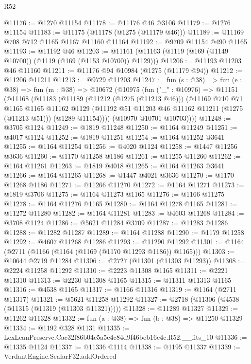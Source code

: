 \begin{lexlean}{R52}
\begin{coremodule}
@11176 := @1270 @11154
@11178 := @11176 @46 @3106
@11179 := @1276 @11154
@11183 := @11175 (@11178 (@1275 (@11179 @46)))
@11189 := @11169 @708 @712 @1165 @1167 @11160 @11164
@11192 := @9709 @11154 @490 @1165
@11193 := @11192 @46
@11203 := @11161 (@11163 (@1119 (@169 (@1149 @10700)) (@1119 (@169 (@1153 @10700)) @1129)))
@11206 := @11193 @11203 @46 @11160
@11211 := @11176 @94 @10984 (@1275 (@11179 @94))
@11212 := @11206 @11211
@11213 := @9729 @11203
@11247 := fun (s : @38) =>
  fun (e : @38) =>
  fun (m : @38) =>
  @10672
    (@10975
      (fun ("_" : @10976) =>
      @11151
        (@11168
          (@11183
            (@11189
              (@11212 (@1275 (@11213 @46)))
              (@11169
                @710
                @71
                @1165
                @1165
                @11162
                @1129
                (@11192 @51 @11203 @46 @11162 @11211 (@1275 (@11213 @51)))
                (@1289 @11154))))
          (@10970 @10701 @10703))))
@11248 := @3705 @1124
@11249 := @1819 @11248
@11250 := @1164 @11249
@11251 := @4017 @1124
@11252 := @1819 @11251
@11254 := @1164 @11252 @3641
@11255 := @1164 @11254
@11256 := @4020 @1124
@11258 := @1447 @11256 @3636
@11260 := @1170 @11258 @1186
@11261 := @11255 @11260
@11262 := @1164 @11261
@11263 := @1819 @4018
@11265 := @1164 @11263 @3641
@11266 := @1164 @11265
@11268 := @1447 @4021 @3636
@11270 := @1170 @11268 @1186
@11271 := @11266 @11270
@11272 := @1164 @11271
@11273 := @1819 @3706
@11275 := @1164 @11273 @1165
@11276 := @1166 @11275
@11278 := @1164 @11276 @1165
@11280 := @1164 @11278 @1165
@11281 := @11272 @11280
@11282 := @1164 @11281
@11283 := @4603 @11268
@11284 := @3708 @1124
@11286 := @5621 @11284 @3709
@11287 := @11283 @11286
@11288 := @11282 @11287
@11289 := @1164 @11288
@11290 := @1179 @11258
@11292 := @4607 @11268 @11286
@11293 := @11290 @11292
@11301 := @1164 (@2711 (@1166 (@1164 (@1169 (@1170 @11293 @1186)) @1165)))
@11303 := @10644 @2719 @11284
@11306 := @2727 (@11301 (@11303 @11293))
@11308 := @2224 @11258 @11292
@11310 := @2223 @11308 @1165
@11311 := @2221 @11310
@11313 := @2230 @11308 @1165
@11315 := @11311 @11313 @1165
@11316 := @4538 @1165
@11317 := @1166 @11316
@11319 := @1164 (@2711 @11317)
@11321 := @5621 @11258 @11292
@11327 := @2718 (@11306 (@4538 (@11315 (@11319 (@11303 @11321)))))
@11328 := @11289 @11327
@11329 := @11262 @11328
@11332 := fun (a : @38) => fun (b : @38) => @11250 @11329
@11334 := @1192 @328 @1131
@11335 := LexLeanPreserve.Cac32f86b04c5a5e4c84d9f46beb16e4c.R52.__fits_10
@11336 := @11335 @1124
@11337 := @11336 @1114
@11338 := @1195 @11337
@11339 := VerdantEngine.ScalarF32.addOrdered

\end{coremodule}
\end{lexlean}
